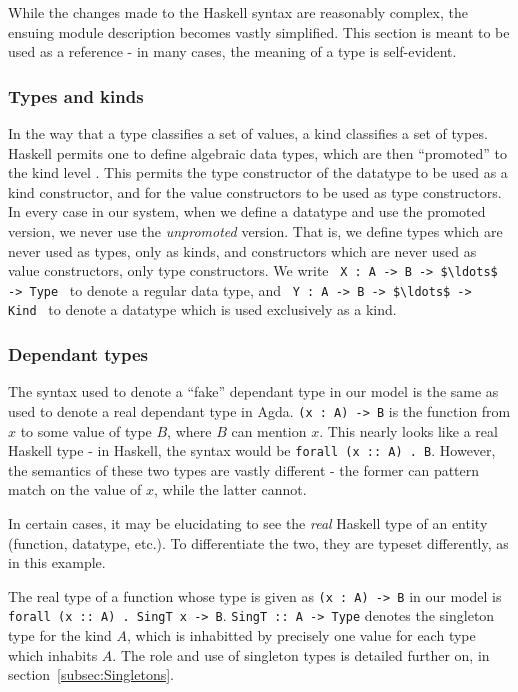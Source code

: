 \documentclass[12pt, svgnames]{article}
\let\Oldsubsubsection\subsubsection
\renewcommand{\subsubsection}{\FloatBarrier\Oldsubsubsection}
\begin{document}
While the changes made to the Haskell syntax are reasonably complex, the ensuing 
module description becomes vastly simplified. This section is meant to be used
as a reference - in many cases, the meaning of a type is self-evident. 

\subsubsection*{Types and kinds}
In the way that a type classifies a set of values, a kind classifies a set of
types. Haskell permits one to define algebraic data types, which are then ``promoted''
to the kind level \cite{promotion}. This permits the type constructor of the datatype to be used
as a kind constructor, and for the value constructors to be used as type constructors. 
In every case in our system, when we define a datatype and use the promoted version,
we never use the \emph{unpromoted} version. That is, we define types which are never
used as types, only as kinds, and constructors which are never used as value constructors,
only type constructors. We write \,\,\,\lstinline!X : A -> B -> $\ldots$ -> Type!\,\,\, to denote
a regular data type, and \,\,\,\lstinline!Y : A -> B -> $\ldots$ -> Kind!\,\,\, to denote a datatype
which is used exclusively as a kind. 

\subsubsection*{Dependant types}
The syntax used to denote a ``fake'' dependant type in our model is the same 
as used to denote a real dependant type in Agda. \lstinline!(x : A) -> B! is the function
from $x$ to some value of type $B$, where $B$ can mention $x$. This nearly looks like a 
real Haskell type - in Haskell, the syntax would be \texttt{forall (x :: A) . B}. However, 
the semantics of these two types are vastly different - the former can pattern match
on the value of $x$, while the latter cannot. 

In certain cases, it may be elucidating to see the \emph{real} Haskell type of
an entity (function, datatype, etc.). To differentiate the two, they are typeset
differently, as in this example.

The real type of a function whose type is given as \lstinline!(x : A) -> B! in
our model is \texttt{forall (x :: A) . SingT x -> B}. \texttt{SingT :: A -> Type}
denotes the singleton type for the kind $A$, which is inhabitted by precisely
one value for each type which inhabits $A$. The role and use of singleton types
is detailed further on, in section~\ref{subsec:Singletons}. 
\end{document}

